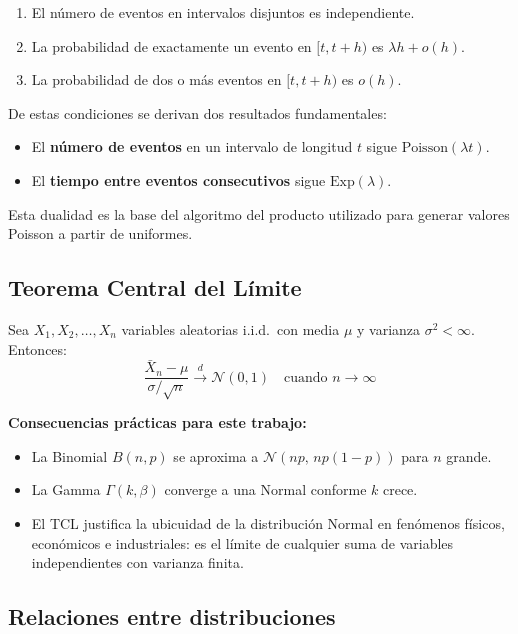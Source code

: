 \documentclass[a4paper, 11pt]{article}
\begin{document}
\begin{enumerate}
    \item El número de eventos en intervalos disjuntos es independiente.
    \item La probabilidad de exactamente un evento en $[t, t+h)$ es $\lambda h + o(h)$.
    \item La probabilidad de dos o más eventos en $[t, t+h)$ es $o(h)$.
\end{enumerate}

De estas condiciones se derivan dos resultados fundamentales:

\begin{itemize}
    \item El \textbf{número de eventos} en un intervalo de longitud $t$ sigue
          $\text{Poisson}(\lambda t)$.
    \item El \textbf{tiempo entre eventos consecutivos} sigue
          $\text{Exp}(\lambda)$.
\end{itemize}

Esta dualidad es la base del algoritmo del producto utilizado para generar valores
Poisson a partir de uniformes.

\subsection{Teorema Central del Límite}

Sea $X_1, X_2, \ldots, X_n$ variables aleatorias i.i.d.\ con media $\mu$ y varianza
$\sigma^2 < \infty$. Entonces:
\begin{equation}
\frac{\bar{X}_n - \mu}{\sigma / \sqrt{n}} \xrightarrow{d} \mathcal{N}(0,1)
\quad \text{cuando } n \to \infty
\end{equation}

\textbf{Consecuencias prácticas para este trabajo:}
\begin{itemize}
    \item La Binomial $B(n,p)$ se aproxima a $\mathcal{N}(np,\, np(1-p))$ para $n$ grande.
    \item La Gamma $\Gamma(k,\beta)$ converge a una Normal conforme $k$ crece.
    \item El TCL justifica la ubicuidad de la distribución Normal en fenómenos
          físicos, económicos e industriales: es el límite de cualquier suma de
          variables independientes con varianza finita.
\end{itemize}

\subsection{Relaciones entre distribuciones}
\end{document}
